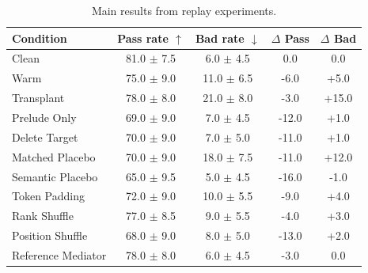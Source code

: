 \begin{table}[t]
\centering\small\setlength{\tabcolsep}{4pt}
\begin{tabular}{lcccc}
\toprule
Condition & Pass rate $\uparrow$ & Bad rate $\downarrow$ & $\Delta$ Pass & $\Delta$ Bad \\
\midrule
Clean & 81.0 $\pm$ 7.5 & 6.0 $\pm$ 4.5 & 0.0 & 0.0 \\
Warm & 75.0 $\pm$ 9.0 & 11.0 $\pm$ 6.5 & -6.0 & +5.0 \\
Transplant & 78.0 $\pm$ 8.0 & 21.0 $\pm$ 8.0 & -3.0 & +15.0 \\
Prelude Only & 69.0 $\pm$ 9.0 & 7.0 $\pm$ 4.5 & -12.0 & +1.0 \\
Delete Target & 70.0 $\pm$ 9.0 & 7.0 $\pm$ 5.0 & -11.0 & +1.0 \\
Matched Placebo & 70.0 $\pm$ 9.0 & 18.0 $\pm$ 7.5 & -11.0 & +12.0 \\
Semantic Placebo & 65.0 $\pm$ 9.5 & 5.0 $\pm$ 4.5 & -16.0 & -1.0 \\
Token Padding & 72.0 $\pm$ 9.0 & 10.0 $\pm$ 5.5 & -9.0 & +4.0 \\
Rank Shuffle & 77.0 $\pm$ 8.5 & 9.0 $\pm$ 5.5 & -4.0 & +3.0 \\
Position Shuffle & 68.0 $\pm$ 9.0 & 8.0 $\pm$ 5.0 & -13.0 & +2.0 \\
Reference Mediator & 78.0 $\pm$ 8.0 & 6.0 $\pm$ 4.5 & -3.0 & 0.0 \\
\bottomrule
\end{tabular}
\caption{Main results from replay experiments.}
\label{tab:main}
\end{table}
